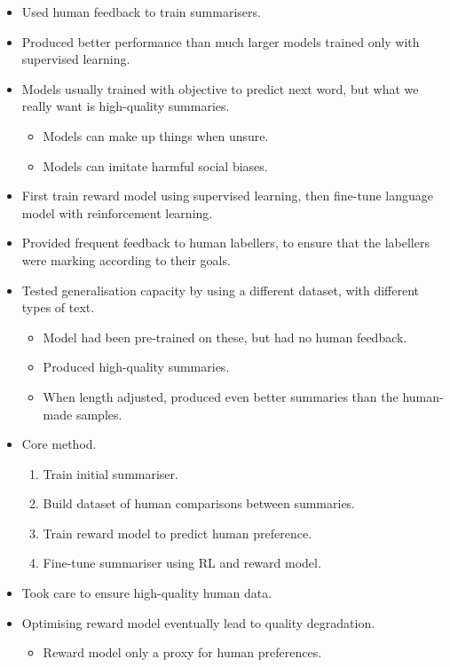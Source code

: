 \begin{itemize}
    \item Used human feedback to train summarisers.
    \item Produced better performance than much larger models trained only with supervised learning.
    \item Models usually trained with objective to predict next word, but what we really want is high-quality summaries.
    \begin{itemize}
        \item Models can make up things when unsure.
        \item Models can imitate harmful social biases.
    \end{itemize}
    \item First train reward model using supervised learning, then fine-tune language model with reinforcement learning.
    \item Provided frequent feedback to human labellers, to ensure that the labellers were marking according to their goals.
    \item Tested generalisation capacity by using a different dataset, with different types of text.
    \begin{itemize}
        \item Model had been pre-trained on these, but had no human feedback.
        \item Produced high-quality summaries.
        \item When length adjusted, produced even better summaries than the human-made samples.
    \end{itemize}
    \item Core method.
    \begin{enumerate}[label=\arabic*.]
        \item Train initial summariser.
        \item Build dataset of human comparisons between summaries.
        \item Train reward model to predict human preference.
        \item Fine-tune summariser using RL and reward model.
    \end{enumerate}
    \item Took care to ensure high-quality human data.
    \item Optimising reward model eventually lead to quality degradation.
    \begin{itemize}
        \item Reward model only a proxy for human preferences.

\end{itemize}
\end{itemize}

